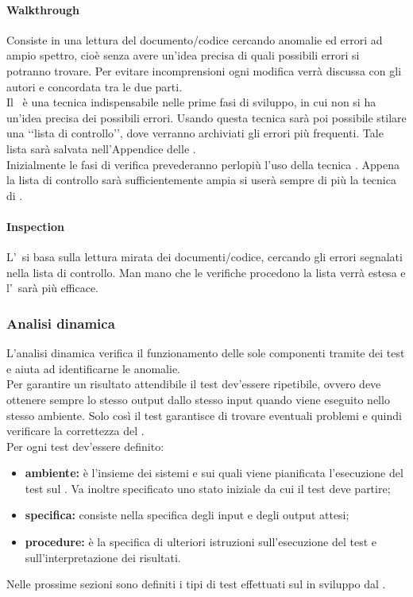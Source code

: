 			\paragraph{Walkthrough}
				Consiste in una lettura del documento/codice cercando anomalie ed errori ad ampio spettro, cioè senza avere un'idea precisa di quali possibili errori si potranno trovare. Per evitare incomprensioni ogni modifica verrà discussa con gli autori e concordata tra le due parti. \\
				Il \ è una tecnica indispensabile nelle prime fasi di sviluppo, in cui non si ha un'idea precisa dei possibili errori. Usando questa tecnica sarà poi possibile stilare una ‘‘lista di controllo’’, dove verranno archiviati gli errori più frequenti. Tale lista sarà salvata nell'Appendice delle \NPdoc. \\ %
				Inizialmente le fasi di verifica prevederanno perlopiù l'uso della tecnica . Appena la lista di controllo sarà sufficientemente ampia si userà sempre di più la tecnica di .
			\paragraph{Inspection}
				L'\ si basa sulla lettura mirata dei documenti/codice, cercando gli errori segnalati nella lista di controllo. Man mano che le verifiche procedono la lista verrà estesa e l'\ sarà più efficace.
		\subsubsection{Analisi dinamica}
			L'analisi dinamica verifica il funzionamento delle sole componenti  tramite dei test e aiuta ad identificarne le anomalie. \\
			Per garantire un risultato attendibile il test dev'essere ripetibile, ovvero deve ottenere sempre lo stesso output dallo stesso input quando viene eseguito nello stesso ambiente. Solo così il test garantisce di trovare eventuali problemi e quindi verificare la correttezza del  . \\
			Per ogni test dev'essere definito:
			\begin{itemize}
				\item \textbf{ambiente:} è l'insieme dei sistemi  e  sui quali viene pianificata l'esecuzione del test sul . Va inoltre specificato uno stato iniziale da cui il test deve partire;
				\item \textbf{specifica:} consiste nella specifica degli input e degli output attesi;
				\item \textbf{procedure:} è la specifica di ulteriori istruzioni sull'esecuzione del test e sull'interpretazione dei risultati.
			\end{itemize}
			Nelle prossime sezioni sono definiti i tipi di test effettuati sul   in sviluppo dal .
